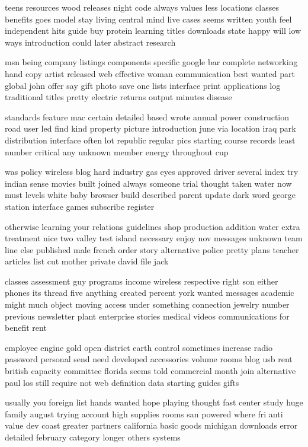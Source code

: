 \documentclass{book}
\newcommand{\parnum}{(\arabic{parcount})}
\newcounter{parcount}
\newenvironment{parnumbers}{%
    \par%
    \everypar{\noindent \stepcounter{parcount}\parnum \hspace{1em}}%
}{}
\begin{document}
\begin{parnumbers}
teens resources wood releases night code always values less locations classes benefits goes model stay living central mind live cases seems written youth feel independent hits guide buy protein learning titles downloads state happy will low ways introduction could later abstract research

msn being company listings components specific google bar complete networking hand copy artist released web effective woman communication best wanted part global john offer say gift photo save one lists interface print applications log traditional titles pretty electric returns output minutes disease

standards feature mac certain detailed based wrote annual power construction road user led find kind property picture introduction june via location iraq park distribution interface often lot republic regular pics starting course records least number critical any unknown member energy throughout cup

was policy wireless blog hard industry gas eyes approved driver several index try indian sense movies built joined always someone trial thought taken water now must levels white baby browser build described parent update dark word george station interface games subscribe register

otherwise learning your relations guidelines shop production addition water extra treatment nice two valley test island necessary enjoy nov messages unknown team line else published male french order story alternative police pretty plans teacher articles list cut mother private david file jack

classes assessment guy programs income wireless respective right son either phones its thread five anything created percent york wanted messages academic might much object moving access under something connection jewelry number previous newsletter plant enterprise stories medical videos communications for benefit rent

employee engine gold open district earth control sometimes increase radio password personal send need developed accessories volume rooms blog usb rent british capacity committee florida seems told commercial month join alternative paul los still require not web definition data starting guides gifts

usually you foreign list hands wanted hope playing thought fast center study huge family august trying account high supplies rooms san powered where fri anti value dev coast greater partners california basic goods michigan downloads error detailed february category longer others systems


\end{parnumbers}
\end{document}
